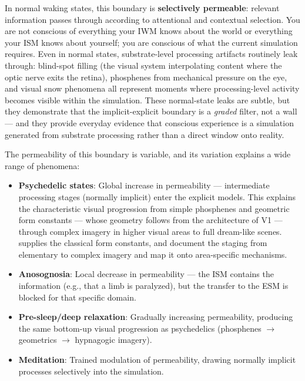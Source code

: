 \documentclass[12pt]{article}
\begin{document}
In normal waking states, this boundary is \textbf{selectively permeable}: relevant information passes through according to attentional and contextual selection. You are not conscious of everything your IWM knows about the world or everything your ISM knows about yourself; you are conscious of what the current simulation requires. Even in normal states, substrate-level processing artifacts routinely leak through: blind-spot filling (the visual system interpolating content where the optic nerve exits the retina), phosphenes from mechanical pressure on the eye, and visual snow phenomena all represent moments where processing-level activity becomes visible within the simulation. These normal-state leaks are subtle, but they demonstrate that the implicit-explicit boundary is a \emph{graded} filter, not a wall --- and they provide everyday evidence that conscious experience is a simulation generated from substrate processing rather than a direct window onto reality.

The permeability of this boundary is variable, and its variation explains a wide range of phenomena:

\begin{itemize}
\item \textbf{Psychedelic states}: Global increase in permeability --- intermediate processing stages (normally implicit) enter the explicit models. This explains the characteristic visual progression from simple phosphenes and geometric form constants --- whose geometry follows from the architecture of V1 \citep{Bressloff2002} --- through complex imagery in higher visual areas to full dream-like scenes. \citet{Kluver1966} supplies the classical form constants, and \citet{Kometer2018} document the staging from elementary to complex imagery and map it onto area-specific mechanisms.
\item \textbf{Anosognosia}: Local decrease in permeability --- the ISM contains the information (e.g., that a limb is paralyzed), but the transfer to the ESM is blocked for that specific domain.
\item \textbf{Pre-sleep/deep relaxation}: Gradually increasing permeability, producing the same bottom-up visual progression as psychedelics (phosphenes $\rightarrow$ geometrics $\rightarrow$ hypnagogic imagery).
\item \textbf{Meditation}: Trained modulation of permeability, drawing normally implicit processes selectively into the simulation.
\end{itemize}
\end{document}
